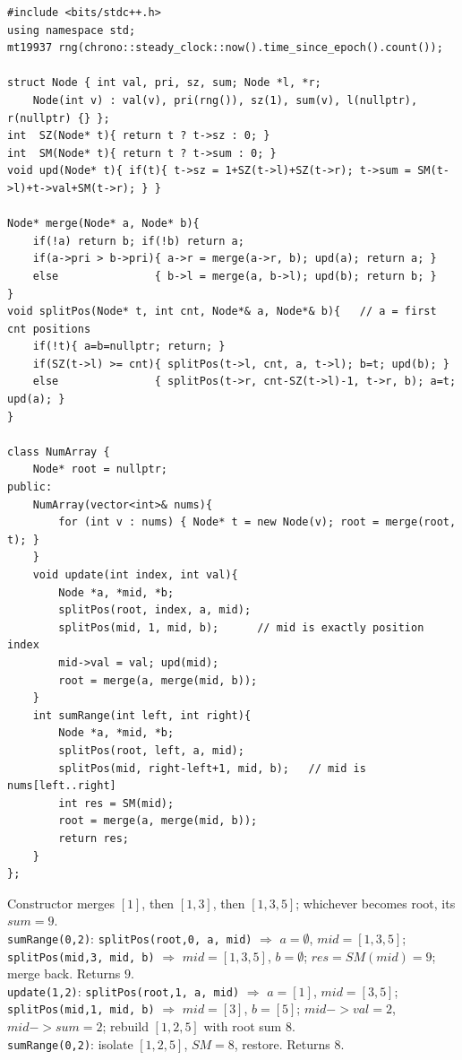 \begin{lstlisting}[caption={Range Sum Query -- Mutable via an implicit, sum-augmented treap (LeetCode 307)}, label={lst:c06-rpmq-soln}]
#include <bits/stdc++.h>
using namespace std;
mt19937 rng(chrono::steady_clock::now().time_since_epoch().count());

struct Node { int val, pri, sz, sum; Node *l, *r;
    Node(int v) : val(v), pri(rng()), sz(1), sum(v), l(nullptr), r(nullptr) {} };
int  SZ(Node* t){ return t ? t->sz : 0; }
int  SM(Node* t){ return t ? t->sum : 0; }
void upd(Node* t){ if(t){ t->sz = 1+SZ(t->l)+SZ(t->r); t->sum = SM(t->l)+t->val+SM(t->r); } }

Node* merge(Node* a, Node* b){
    if(!a) return b; if(!b) return a;
    if(a->pri > b->pri){ a->r = merge(a->r, b); upd(a); return a; }
    else               { b->l = merge(a, b->l); upd(b); return b; }
}
void splitPos(Node* t, int cnt, Node*& a, Node*& b){   // a = first cnt positions
    if(!t){ a=b=nullptr; return; }
    if(SZ(t->l) >= cnt){ splitPos(t->l, cnt, a, t->l); b=t; upd(b); }
    else               { splitPos(t->r, cnt-SZ(t->l)-1, t->r, b); a=t; upd(a); }
}

class NumArray {
    Node* root = nullptr;
public:
    NumArray(vector<int>& nums){
        for (int v : nums) { Node* t = new Node(v); root = merge(root, t); }
    }
    void update(int index, int val){
        Node *a, *mid, *b;
        splitPos(root, index, a, mid);
        splitPos(mid, 1, mid, b);      // mid is exactly position index
        mid->val = val; upd(mid);
        root = merge(a, merge(mid, b));
    }
    int sumRange(int left, int right){
        Node *a, *mid, *b;
        splitPos(root, left, a, mid);
        splitPos(mid, right-left+1, mid, b);   // mid is nums[left..right]
        int res = SM(mid);
        root = merge(a, merge(mid, b));
        return res;
    }
};
\end{lstlisting}

\begin{tracebox}
Constructor merges $[1]$, then $[1,3]$, then $[1,3,5]$; whichever becomes root, its $\mathit{sum}=9$.\\
\texttt{sumRange(0,2)}: \texttt{splitPos(root,0, a, mid)} $\Rightarrow$ $a=\emptyset$, $mid=[1,3,5]$;
\texttt{splitPos(mid,3, mid, b)} $\Rightarrow$ $mid=[1,3,5]$, $b=\emptyset$; $res=\mathit{SM}(mid)=9$;
merge back. Returns $\boxed{9}$.\\
\texttt{update(1,2)}: \texttt{splitPos(root,1, a, mid)} $\Rightarrow$ $a=[1]$, $mid=[3,5]$;
\texttt{splitPos(mid,1, mid, b)} $\Rightarrow$ $mid=[3]$, $b=[5]$; $mid->val=2$, $mid->sum=2$;
rebuild $[1,2,5]$ with root sum $8$.\\
\texttt{sumRange(0,2)}: isolate $[1,2,5]$, $\mathit{SM}=8$, restore. Returns $\boxed{8}$. \checkmark
\end{tracebox}

